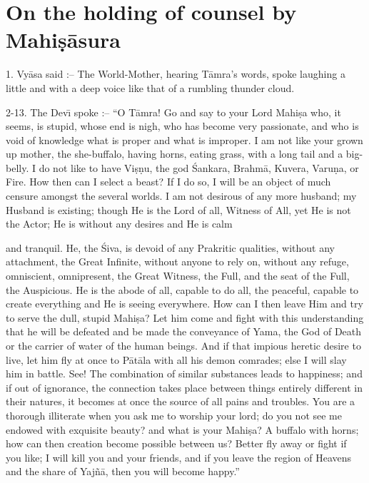 \chapter{On the holding of counsel by Mahi\d{s}\=asura}

1. Vy\=asa said :-- The World-Mother, hearing T\=amra's words, spoke laughing a little and with a deep voice like that of a rumbling thunder cloud.

2-13. The Dev\={\i} spoke :-- ``O T\=amra! Go and say to your Lord Mahi\d{s}a who, it seems, is stupid, whose end is nigh, who has become very passionate, and who is void of knowledge what is proper and what is improper. I am not like your grown up mother, the she-buffalo, having horns, eating grass, with a long tail and a big-belly. I do not like to have Vi\d{s}\d{n}u, the god \'Sankara, Brahm\=a, Kuvera, Varu\d{n}a, or Fire. How then can I select a beast? If I do so, I will be an object of much censure amongst the several worlds. I am not desirous of any more husband; my Husband is existing; though He is the Lord of all, Witness of All, yet He is not the Actor; He is without any desires and He is calm

and tranquil. He, the \'Siva, is devoid of any Prakritic qualities, without any attachment, the Great Infinite, without anyone to rely on, without any refuge, omniscient, omnipresent, the Great Witness, the Full, and the seat of the Full, the Auspicious. He is the abode of all, capable to do all, the peaceful, capable to create everything and He is seeing everywhere. How can I then leave Him and try to serve the dull, stupid Mahi\d{s}a? Let him come and fight with this understanding that he will be defeated and be made the conveyance of Yama, the God of Death or the carrier of water of the human beings. And if that impious heretic desire to live, let him fly at once to P\=at\=ala with all his demon comrades; else I will slay him in battle. See! The combination of similar substances leads to happiness; and if out of ignorance, the connection takes place between things entirely different in their natures, it becomes at once the source of all pains and troubles. You are a thorough illiterate when you ask me to worship your lord; do you not see me endowed with exquisite beauty? and what is your Mahi\d{s}a? A buffalo with horns; how can then creation become possible between us? Better fly away or fight if you like; I will kill you and your friends, and if you leave the region of Heavens and the share of Yaj\~n\=a, then you will become happy.''

